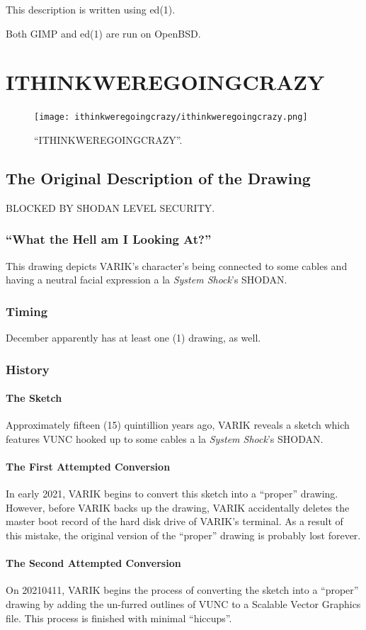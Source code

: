 \documentclass{report}
\begin{document}
This description is written using ed(1).

Both GIMP and ed(1) are run on OpenBSD\@.
\chapter{ITHINKWEREGOINGCRAZY}
\begin{figure}[ht]
	\centering
	\texttt{[image: ithinkweregoingcrazy/ithinkweregoingcrazy.png]}
	\caption[center]{``ITHINKWEREGOINGCRAZY''.}
\end{figure}
\section{The Original Description of the Drawing}
BLOCKED BY SHODAN LEVEL SECURITY\@.
\subsection{``What the Hell am I Looking At?''}
This drawing depicts VARIK's character's being connected to some cables and having a neutral facial expression a la \textit{System Shock}'s SHODAN\@.
\subsection{Timing}
December apparently has at least one (1) drawing, as well.
\subsection{History}
\subsubsection{The Sketch}
Approximately fifteen (15) quintillion years ago, VARIK reveals a sketch which features VUNC hooked up to some cables a la \textit{System Shock}'s SHODAN\@.
\subsubsection{The First Attempted Conversion}
In early 2021, VARIK begins to convert this sketch into a ``proper'' drawing.  However, before VARIK backs up the drawing, VARIK accidentally deletes the master boot record of the hard disk drive of VARIK's terminal.  As a result of this mistake, the original version of the ``proper'' drawing is probably lost forever.
\subsubsection{The Second Attempted Conversion}
On 20210411, VARIK begins the process of converting the sketch into a ``proper'' drawing by adding the un-furred outlines of VUNC to a Scalable Vector Graphics file.  This process is finished with minimal ``hiccups''.
\end{document}
